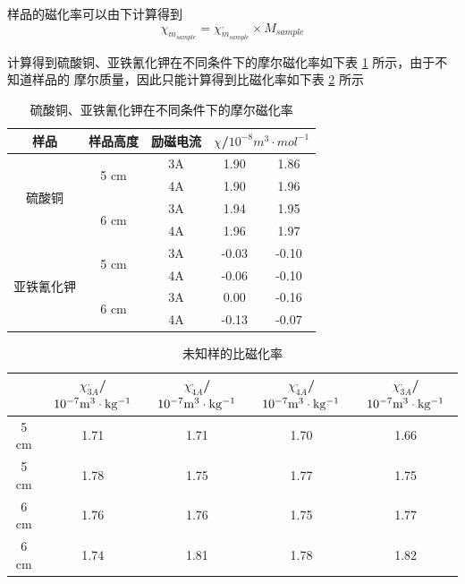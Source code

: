 \documentclass[cn,hazy,pku,12pt,normal,math=newtx,cite=super]{elegantnote}
\begin{document}
样品的磁化率可以由下计算得到
$$
\chi_{m_{sample}} = \chi^,_{m_{sample}} \times M_{sample}
$$

计算得到硫酸铜、亚铁氰化钾在不同条件下的摩尔磁化率如下表 \ref{03} 所示，由于不知道样品的
摩尔质量，因此只能计算得到比磁化率如下表 \ref{04} 所示

\begin{table}[h]
    \centering
    \caption{硫酸铜、亚铁氰化钾在不同条件下的摩尔磁化率}
    \label{03}
    \begin{tabular}{ccccc}
    \hline
    样品                     & 样品高度                  & 励磁电流 & \multicolumn{2}{c}{$\chi$/$10^{-8} m^3   \cdot mol^{-1}$} \\ \hline
    \multirow{4}{*}{硫酸铜} & \multirow{2}{*}{5 cm} & 3A       & 1.90          & 1.86                        \\
                           &                       & 4A       & 1.90          & 1.96                        \\
                           & \multirow{2}{*}{6 cm} & 3A       & 1.94          & 1.95                        \\
                           &                       & 4A       & 1.96          & 1.97                        \\ \hline
    \multirow{4}{*}{亚铁氰化钾} & \multirow{2}{*}{5 cm} & 3A   & -0.03         & -0.10                       \\
                           &                       & 4A       & -0.06         & -0.10                       \\
                           & \multirow{2}{*}{6 cm} & 3A       & 0.00          & -0.16                       \\
                           &                       & 4A       & -0.13         & -0.07                       \\ \hline
    \end{tabular}
    \end{table}

\begin{table}[h]
    \centering
    \caption{未知样的比磁化率
    }
    \label{04}
    \begin{tabular}{ccccc}
    \hline
     &
      $\chi^,_{3A}$/$\rm 10^{-7} m^3 \cdot   kg^{-1}$ &
      $\chi^,_{4A}$/$\rm 10^{-7} m^3 \cdot   kg^{-1}$ &
      $\chi^,_{4A}$/$\rm 10^{-7} m^3 \cdot   kg^{-1}$ &
      $\chi^,_{3A}$/$\rm 10^{-7} m^3 \cdot   kg^{-1}$ \\ \hline
    5 cm & 1.71 & 1.71 & 1.70 & 1.66 \\
    5 cm & 1.78 & 1.75 & 1.77 & 1.75 \\
    6 cm & 1.76 & 1.76 & 1.75 & 1.77 \\
    6 cm & 1.74 & 1.81 & 1.78 & 1.82 \\ \hline
    \end{tabular}
\end{table}
\end{document}
